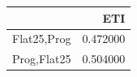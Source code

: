 \begin{tabular}{lr}
\toprule
 & ETI \\
\midrule
Flat25,Prog & 0.472000 \\
Prog,Flat25 & 0.504000 \\
\bottomrule
\end{tabular}
